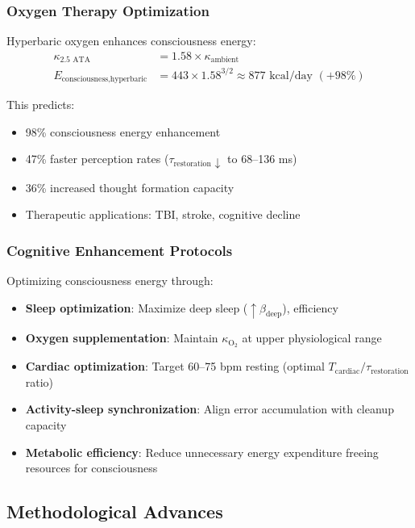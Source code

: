 \documentclass[12pt,twocolumn]{article}
\theoremstyle{remark}
\begin{document}
\subsubsection{Oxygen Therapy Optimization}

Hyperbaric oxygen enhances consciousness energy:
\begin{align}
\kappa_{\text{2.5 ATA}} &= 1.58 \times \kappa_{\text{ambient}} \\
E_{\text{consciousness,hyperbaric}} &= 443 \times 1.58^{3/2} \approx 877 \text{ kcal/day } (+98\%)
\end{align}

This predicts:
\begin{itemize}
\item 98\% consciousness energy enhancement
\item 47\% faster perception rates ($\tau_{\text{restoration}} \downarrow$ to 68--136 ms)
\item 36\% increased thought formation capacity
\item Therapeutic applications: TBI, stroke, cognitive decline
\end{itemize}

\subsubsection{Cognitive Enhancement Protocols}

Optimizing consciousness energy through:
\begin{itemize}
\item \textbf{Sleep optimization}: Maximize deep sleep ($\uparrow \beta_{\text{deep}}$), efficiency
\item \textbf{Oxygen supplementation}: Maintain $\kappa_{\text{O}_2}$ at upper physiological range
\item \textbf{Cardiac optimization}: Target 60--75 bpm resting (optimal $T_{\text{cardiac}}/\tau_{\text{restoration}}$ ratio)
\item \textbf{Activity-sleep synchronization}: Align error accumulation with cleanup capacity
\item \textbf{Metabolic efficiency}: Reduce unnecessary energy expenditure freeing resources for consciousness
\end{itemize}

\subsection{Methodological Advances}
\end{document}
